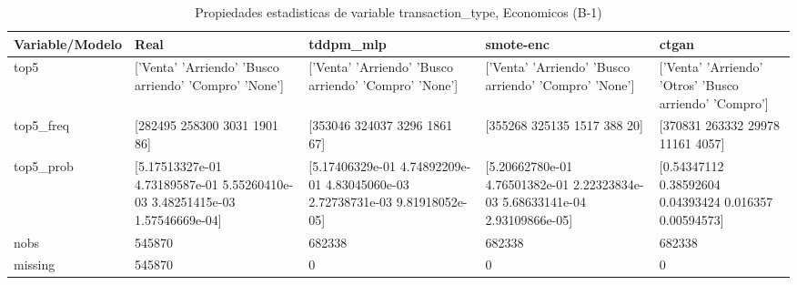 \begin{table}[H]
\centering
\fontsize{8}{14}\selectfont
\caption{Propiedades  estadisticas de variable transaction\_type, Economicos (B-1)}
\label{table-stats-economicos-b-1-transaction_type}
\begin{tabular}{|l|m{10em}|m{10em}|m{10em}|m{10em}|}
\hline
 \rowcolor[gray]{0.8}
Variable/Modelo & Real & tddpm\_mlp & smote-enc & ctgan \\
\hline top5 & ['Venta' 'Arriendo' 'Busco arriendo' 'Compro' 'None'] & ['Venta' 'Arriendo' 'Busco arriendo' 'Compro' 'None'] & ['Venta' 'Arriendo' 'Busco arriendo' 'Compro' 'None'] & ['Venta' 'Arriendo' 'Otros' 'Busco arriendo' 'Compro'] \\
\hline top5\_freq & [282495 258300   3031   1901     86] & [353046 324037   3296   1861     67] & [355268 325135   1517    388     20] & [370831 263332  29978  11161   4057] \\
\hline top5\_prob & [5.17513327e-01 4.73189587e-01 5.55260410e-03 3.48251415e-03
 1.57546669e-04] & [5.17406329e-01 4.74892209e-01 4.83045060e-03 2.72738731e-03
 9.81918052e-05] & [5.20662780e-01 4.76501382e-01 2.22323834e-03 5.68633141e-04
 2.93109866e-05] & [0.54347112 0.38592604 0.04393424 0.016357   0.00594573] \\
\hline nobs & 545870 & 682338 & 682338 & 682338 \\
\hline missing & 545870 & 0 & 0 & 0 \\
\hline
\end{tabular}
\end{table}
